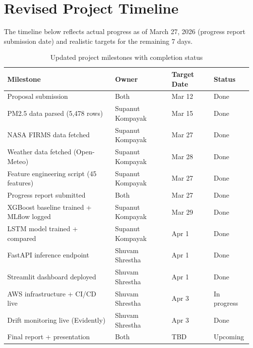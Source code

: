 \documentclass[12pt,a4paper]{report}
\begin{document}
\section{Revised Project Timeline}

The timeline below reflects actual progress as of March 27, 2026 (progress report submission date) and realistic targets for the remaining 7 days.

\begin{table}[H]
\centering
\caption{Updated project milestones with completion status}
\label{tab:timeline}
\begin{tabular}{@{}p{7cm}p{3cm}lp{1.5cm}@{}}
\toprule
\textbf{Milestone} & \textbf{Owner} & \textbf{Target Date} & \textbf{Status} \\
\midrule
Proposal submission               & Both            & Mar 12 & {\color{green}Done} \\
PM2.5 data parsed (5,478 rows)    & Supanut Kompayak & Mar 15 & {\color{green}Done} \\
NASA FIRMS data fetched           & Supanut Kompayak & Mar 27 & {\color{green}Done} \\
Weather data fetched (Open-Meteo) & Supanut Kompayak & Mar 28 & {\color{green}Done} \\
Feature engineering script (45 features) & Supanut Kompayak & Mar 27 & {\color{green}Done} \\
Progress report submitted         & Both            & Mar 27 & {\color{green}Done} \\
XGBoost baseline trained + MLflow logged & Supanut Kompayak & Mar 29 & {\color{green}Done} \\
LSTM model trained + compared     & Supanut Kompayak & Apr 1  & {\color{green}Done} \\
FastAPI inference endpoint        & Shuvam Shrestha & Apr 1  & {\color{green}Done} \\
Streamlit dashboard deployed      & Shuvam Shrestha & Apr 1  & {\color{green}Done} \\
AWS infrastructure + CI/CD live   & Shuvam Shrestha & Apr 3  & {\color{orange}In progress} \\
Drift monitoring live (Evidently) & Shuvam Shrestha & Apr 3  & {\color{green}Done} \\
Final report + presentation       & Both            & TBD    & Upcoming \\
\bottomrule
\end{tabular}
\end{table}
\end{document}
